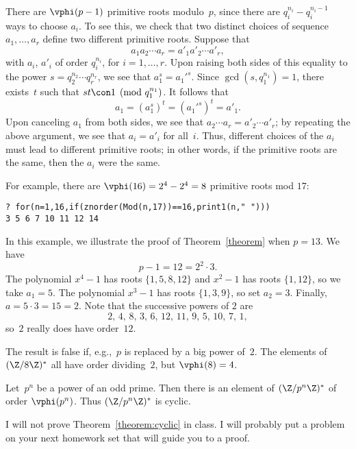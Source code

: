 \documentclass[11pt]{report}
\begin{document}
\begin{remark}
  There are $\vphi(p-1)$ primitive roots modulo~$p$, since there are
  $q_i^{n_i} - q_i^{n_i-1}$ ways to choose $a_i$.  To see this, we check
  that two distinct choices of sequence $a_1,\ldots, a_r$ define two
  different primitive roots.  Suppose that
  $$
    a_1 a_2 \cdots a_r = a'_1 a'_2 \cdots a'_r,
  $$
  with $a_i$, $a'_i$ of order $q_i^{n_i}$, for $i=1,\ldots,r$.
  Upon raising both sides of this equality to the power
  $s = q_2^{n_2}\cdots q_r^{n_r}$, we see that
  $a_1^s = a_1'^s$.  Since $\gcd(s,q_1^{n_1})=1$,
  there exists~$t$ such that $st\con1\pmod{q_1^{n_1}}$.
  It follows that
  $$
    a_1 = (a_1^s)^t = (a_1'^s)^t = a'_1.
  $$
  Upon canceling $a_1$ from both sides, we see that $a_2 \cdots a_r =
    a'_2 \cdots a'_r$; by repeating the above argument, we see that $a_i =
    a'_i$ for all~$i$.  Thus, different choices of the $a_i$ must lead to
  different primitive roots; in other words, if the primitive roots are the
  same, then the $a_i$ were the same.

  For example, there are $\vphi(16)=2^4-2^4=8$ primitive roots
  mod $17$:
  \begin{verbatim}
? for(n=1,16,if(znorder(Mod(n,17))==16,print1(n," ")))
3 5 6 7 10 11 12 14
\end{verbatim}
\end{remark}

\begin{example}
  In this example, we illustrate the proof of Theorem~\ref{theorem}
  when $p=13$.   We have
  $$p-1 = 12 = 2^2\cdot 3.$$
  The polynomial $x^4 - 1$ has roots $\{1,5,8,12\}$ and
  $x^2-1$ has roots $\{1,12\}$, so we take $a_1=5$.
  The polynomial $x^3-1$ has roots $\{1,3,9\}$, so
  set $a_2=3$.  Finally, $a=5\cdot 3=15=2$.  Note
  that the successive powers of $2$ are
  $$2,\, 4,\, 8,\,  3,\,  6,\,  12,\,  11,\,  9,\,  5,\,  10,\,  7,\,  1,$$
  so~$2$ really does have order~$12$.
\end{example}

\begin{example}
  The result is false if, e.g.,~$p$ is replaced by a big power of~$2$.
  The elements of $(\Z/8\Z)^*$ all have order dividing~$2$, but
  $\vphi(8)=4$.
\end{example}


\begin{theorem}\label{theorem:cyclic}
  Let~$p^n$ be a power of an odd prime.  Then there is an element of
  $(\Z/p^n\Z)^*$ of order $\vphi(p^n)$.  Thus $(\Z/p^n\Z)^*$ is cyclic.
\end{theorem}
I will not prove Theorem~\ref{theorem:cyclic} in class.  I will
probably put a problem on your next homework set that will guide you
to a proof.
\end{document}

